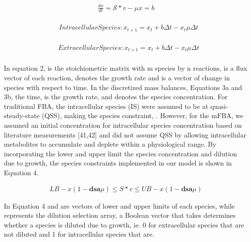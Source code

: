 \documentclass[12pt]{article}
\begin{document}
\begin{equation}\label{eq:MB1}
\begin{aligned}
\frac{dx}{dt}= \mathcal{S}* v- \mu x=b \\
\end{aligned}
\end{equation}

\begin{equation}\label{eq:MB2}
\begin{aligned}
&Intracellular Species: x_{t+1} = x_t + b\Delta t - x_t \mu \Delta t\\
\end{aligned}
\end{equation}

\begin{equation}\label{eq:MB3}
\begin{aligned}
&Extracellular Species: x_{t+1} = x_t + b\Delta t - x_t \mu \Delta t\\
\end{aligned}
\end{equation}



In equation 2,  is the stoichiometric matrix with m species by n reactions,  is a flux vector of each reaction, denotes the growth rate and  is a vector of change in species with respect to time. In the discretized mass balances, Equations 3a and 3b,  the time, is the growth rate, and  denotes the species concentration. For traditional FBA, the intracellular species (IS) were assumed to be at quasi-steady-state (QSS), making the species constraint, . However, for the mFBA, we assumed an initial concentration for intracellular species concentration based on literature measurements [41,42] and did not assume QSS by allowing intracellular metabolites to accumulate and deplete within a physiological range. By incorporating the lower and upper limit the species concentration and dilution due to growth, the species constraints implemented in our model is shown in Equation 4. 

\begin{equation}\label{eq:SBA}
\begin{aligned}
LB - x(1-\mathbf{dsa}\mu)\le S*v \le UB - x(1-\mathbf{dsa}\mu)
\end{aligned}
\end{equation}

In Equation 4  and  are vectors of lower and upper limits of each species, while  represents the dilution selection array, a Boolean vector that takes determines whether a species is diluted due to growth, ie. 0 for extracellular species that are not diluted and 1 for intracellular species that are.
\end{document}
